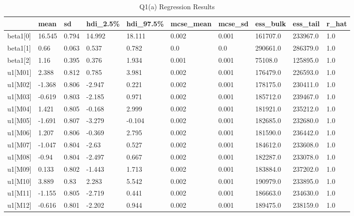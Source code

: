 \documentclass{homeworg}
\begin{document}
\begin{table}[H]
	\caption{Q1(a) Regression Results}
	\begin{tabular}{llllllllll}
		\hline \hline
		& mean   & sd    & hdi\_2.5\% & hdi\_97.5\% & mcse\_mean & mcse\_sd & ess\_bulk & ess\_tail & r\_hat \\ \hline
		beta1{[}0{]} & 16.545 & 0.794 & 14.992     & 18.111      & 0.002      & 0.001    & 161707.0  & 233967.0  & 1.0    \\
		beta1{[}1{]} & 0.66   & 0.063 & 0.537      & 0.782       & 0.0        & 0.0      & 290661.0  & 286379.0  & 1.0    \\
		beta1{[}2{]} & 1.16   & 0.395 & 0.376      & 1.934       & 0.001      & 0.001    & 75108.0   & 125895.0  & 1.0    \\
		u1{[}M01{]}  & 2.388  & 0.812 & 0.785      & 3.981       & 0.002      & 0.001    & 176479.0  & 226593.0  & 1.0    \\
		u1{[}M02{]}  & -1.368 & 0.806 & -2.947     & 0.221       & 0.002      & 0.001    & 178175.0  & 230411.0  & 1.0    \\
		u1{[}M03{]}  & -0.619 & 0.803 & -2.185     & 0.971       & 0.002      & 0.001    & 185712.0  & 239467.0  & 1.0    \\
		u1{[}M04{]}  & 1.421  & 0.805 & -0.168     & 2.999       & 0.002      & 0.001    & 181921.0  & 235212.0  & 1.0    \\
		u1{[}M05{]}  & -1.691 & 0.807 & -3.279     & -0.104      & 0.002      & 0.001    & 182685.0  & 232680.0  & 1.0    \\
		u1{[}M06{]}  & 1.207  & 0.806 & -0.369     & 2.795       & 0.002      & 0.001    & 181590.0  & 236442.0  & 1.0    \\
		u1{[}M07{]}  & -1.047 & 0.804 & -2.63      & 0.527       & 0.002      & 0.001    & 184612.0  & 233608.0  & 1.0    \\
		u1{[}M08{]}  & -0.94  & 0.804 & -2.497     & 0.667       & 0.002      & 0.001    & 182287.0  & 233078.0  & 1.0    \\
		u1{[}M09{]}  & 0.133  & 0.802 & -1.443     & 1.713       & 0.002      & 0.001    & 183884.0  & 237202.0  & 1.0    \\
		u1{[}M10{]}  & 3.889  & 0.83  & 2.283      & 5.542       & 0.002      & 0.001    & 190979.0  & 233895.0  & 1.0    \\
		u1{[}M11{]}  & -1.155 & 0.805 & -2.719     & 0.441       & 0.002      & 0.001    & 186663.0  & 234630.0  & 1.0    \\
		u1{[}M12{]}  & -0.616 & 0.801 & -2.202     & 0.944       & 0.002      & 0.001    & 189475.0  & 238159.0  & 1.0    \\

\end{tabular}
\end{table}
\end{document}
